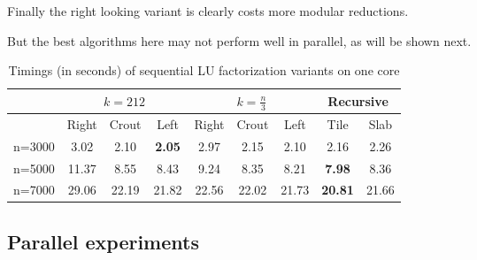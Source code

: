 \documentclass{article}
\begin{document}
 
Finally the right looking variant is clearly costs more modular reductions.
 
But the best algorithms here may not perform well in parallel, as will be shown next.
 
 
 
 
 
 
 
 
 


\begin{table}[htbp] 
\begin{center}
 
\renewcommand{\arraystretch}{1.2}
\begin{tabular}{l|ccc|ccc|cc}
\toprule
  & \multicolumn{3}{c}{$k=212$} & \multicolumn{3}{c}{$k=\frac{n}{3}$} & \multicolumn{2}{c}{Recursive}\\
\midrule
   & Right & Crout & Left       & Right & Crout & Left   & Tile & Slab\\
\midrule
n=3000 & \multicolumn{1}{c}{3.02} & 2.10 & \textbf{2.05}  & \multicolumn{1}{c}{2.97} & 2.15 & 2.10  & \multicolumn{1}{c}{2.16} &
2.26\\
\midrule
n=5000 & \multicolumn{1}{c}{11.37} & 8.55 & 8.43  & \multicolumn{1}{c}{9.24} & 8.35 & 8.21  &\multicolumn{1}{c}{\textbf{7.98}} &
8.36\\
\midrule
n=7000 & \multicolumn{1}{c}{29.06} & 22.19 & 21.82  & \multicolumn{1}{c}{22.56} & 22.02 & 21.73  & \multicolumn{1}{c}{\textbf{20.81}} & 21.66\\
\bottomrule
\end{tabular}
\end{center}
\caption{Timings (in seconds) of sequential LU factorization variants on one core}  
\label{tab:overhead} \vspace{-20pt}
\end{table}
 
 
 
 
 
 
 
 
 
 
 
 
 
 

 
 
 
 
\subsection{Parallel experiments}
 
 
 
\end{document}
